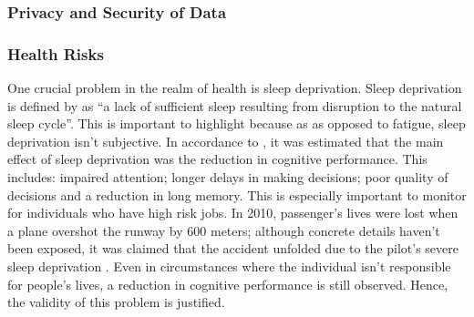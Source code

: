 \subsubsection{Privacy and Security of Data}



\subsubsection{Health Risks}

One crucial problem in the realm of health is sleep deprivation. Sleep deprivation is defined by
\textcite{BMA:2018aa} as ``a lack of sufficient sleep resulting from disruption to the natural sleep
cycle''. This is important to highlight because as as opposed to fatigue, sleep deprivation isn't
subjective. In accordance to \textcite{Alhola:2007aa}, it was estimated that the main effect of
sleep deprivation was the reduction in cognitive performance. This includes: impaired attention;
longer delays in making decisions; poor quality of decisions and a reduction in long memory. This is
especially important to monitor for individuals who have high risk jobs. In 2010, passenger's lives
were lost when a plane overshot the runway by 600 meters; although concrete details haven't been
exposed, it was claimed that the accident unfolded due to the pilot's severe sleep deprivation
\parencite{BBC:2010aa}. Even in circumstances where the individual isn't responsible for people's
lives, a reduction in cognitive performance is still observed. Hence, the validity of this problem
is justified.
